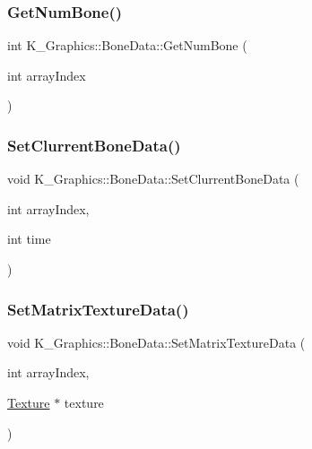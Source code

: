 \subsubsection{\texorpdfstring{Get\+Num\+Bone()}{GetNumBone()}}
{\footnotesize\ttfamily int K\+\_\+\+Graphics\+::\+Bone\+Data\+::\+Get\+Num\+Bone (\begin{DoxyParamCaption}\item[{int}]{array\+Index }\end{DoxyParamCaption})}

\mbox{\label{class_k___graphics_1_1_bone_data_ab35b68473446fa8c476220c34b47cf5d}} 
\subsubsection{\texorpdfstring{Set\+Clurrent\+Bone\+Data()}{SetClurrentBoneData()}}
{\footnotesize\ttfamily void K\+\_\+\+Graphics\+::\+Bone\+Data\+::\+Set\+Clurrent\+Bone\+Data (\begin{DoxyParamCaption}\item[{int}]{array\+Index,  }\item[{int}]{time }\end{DoxyParamCaption})}

\mbox{\label{class_k___graphics_1_1_bone_data_a51bd89e02a538b588f0b9e620fa8dbcb}} 
\subsubsection{\texorpdfstring{Set\+Matrix\+Texture\+Data()}{SetMatrixTextureData()}}
{\footnotesize\ttfamily void K\+\_\+\+Graphics\+::\+Bone\+Data\+::\+Set\+Matrix\+Texture\+Data (\begin{DoxyParamCaption}\item[{int}]{array\+Index,  }\item[{\mbox{\hyperlink{class_k___graphics_1_1_texture}{Texture}} $\ast$}]{texture }\end{DoxyParamCaption})}

